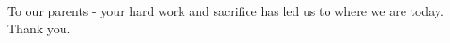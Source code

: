 
\thispagestyle{empty}

\begin{center}
	To our parents - your hard work and sacrifice has led us to where we are today.
\\
	Thank you.
\end{center}

\newpage
